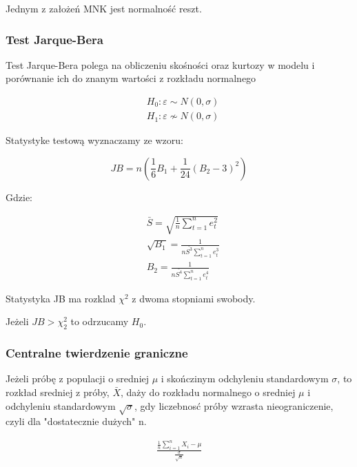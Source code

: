 Jednym z założeń MNK jest normalność reszt.

\subsubsection{Test Jarque-Bera}
Test Jarque-Bera polega na obliczeniu skośności oraz kurtozy w modelu i porównanie ich do znanym wartości z rozkładu normalnego

\begin{equation}
    \begin{split}
        &H_0: \varepsilon \sim N(0,\sigma) \\
        &H_1: \varepsilon \not\sim N(0,\sigma)
    \end{split}
\end{equation}

Statystyke testową wyznaczamy ze wzoru:

\begin{equation}
    JB = n (\frac{1}{6}B_1 + \frac{1}{24}(B_2 -3)^2)
\end{equation}

Gdzie:

\begin{equation}
    \begin{split}
        &\bar{S} = \sqrt{\frac{1}{n}\sum_{t=1}^{n}e^2_t} \\
        &\sqrt{B_1} = \frac{1}{n\bar{S^3}\sum_{t=1}^{n}e^3_t}  \\
        & B_2 = \frac{1}{n\bar{S^4}\sum_{t=1}^{n}{e^4_t}}
    \end{split}
\end{equation}

Statystyka JB ma rozklad \(\chi^2\) z dwoma stopniami swobody.

Jeżeli \(JB > \chi^2_2\) to odrzucamy \(H_0\).

\subsubsection{Centralne twierdzenie graniczne}

Jeżeli próbę z populacji o sredniej \(\mu\) i skończinym odchyleniu standardowym \(\sigma \), to rozkład sredniej z próby, \(\bar{X}\), daży do rozkładu normalnego o sredniej \(\mu\) i odchyleniu standardowym \(\sqrt{\sigma} \), gdy liczebnosć próby wzrasta nieograniczenie, czyli dla "dostatecznie dużych" n.

\begin{equation}
    \begin{split}
        \frac{\frac{1}{n} \sum_{i=1}^{n} X_i - \mu}{\frac{\sigma}{\sqrt{n}}}
    \end{split}
\end{equation}

